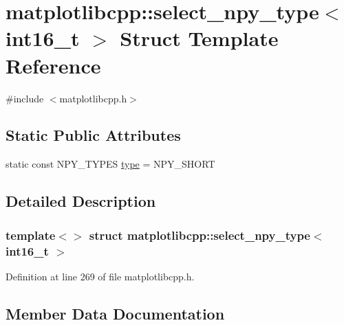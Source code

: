 \hypertarget{structmatplotlibcpp_1_1select__npy__type_3_01int16__t_01_4}{}\section{matplotlibcpp\+::select\+\_\+npy\+\_\+type$<$ int16\+\_\+t $>$ Struct Template Reference}
\label{structmatplotlibcpp_1_1select__npy__type_3_01int16__t_01_4}


{\ttfamily \#include $<$matplotlibcpp.\+h$>$}

\subsection*{Static Public Attributes}
\begin{DoxyCompactItemize}
\item 
static const N\+P\+Y\+\_\+\+T\+Y\+P\+ES \mbox{\hyperlink{structmatplotlibcpp_1_1select__npy__type_3_01int16__t_01_4_aa7e1803c594ccc58c2cd4c8818d5a158}{type}} = N\+P\+Y\+\_\+\+S\+H\+O\+RT
\end{DoxyCompactItemize}


\subsection{Detailed Description}
\subsubsection*{template$<$$>$\newline
struct matplotlibcpp\+::select\+\_\+npy\+\_\+type$<$ int16\+\_\+t $>$}



Definition at line 269 of file matplotlibcpp.\+h.



\subsection{Member Data Documentation}
\mbox{\label{structmatplotlibcpp_1_1select__npy__type_3_01int16__t_01_4_aa7e1803c594ccc58c2cd4c8818d5a158}} 
